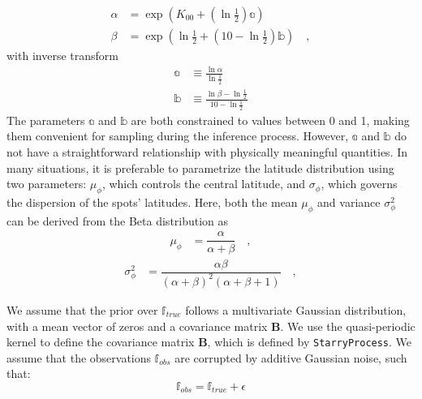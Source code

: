\documentclass[twocolumn]{aastex631}
\begin{document}
%
\begin{align}
    \label{eq:beta2gauss}
    \alpha & = \exp\left({K_{00} + (\ln\frac{1}{2})\mathbb{a}}\right)
    \nonumber                                                 \\
    \beta  & = \exp\left({\ln\frac{1}{2} + (10 - \ln\frac{1}{2})\mathbb{b}}\right)
    \quad,
\end{align}
%
with inverse transform
%
\begin{align}
    \label{eq:gauss2beta}
    \mathbb{a} & \equiv \frac{\ln\alpha}{\ln\frac{1}{2}}
    \nonumber                                             \\[0.5em]
    \mathbb{b} & \equiv \frac{\ln\beta - \ln\frac{1}{2}}{10 -\ln\frac{1}{2}}
\end{align}
%
The parameters $\mathbb{a}$ and $\mathbb{b}$ are both constrained to values between 0 and 1, making them convenient for sampling during the inference process. 
However, $\mathbb{a}$ and $\mathbb{b}$ do not have a straightforward relationship with physically meaningful quantities. In many situations, it is preferable to parametrize 
the latitude distribution using two parameters: $\mu_\phi$, which controls the central latitude, and $\sigma_\phi$, which governs the dispersion of the 
spots' latitudes. Here, both the mean $\mu_\phi$ and variance $\sigma^2_\phi$ can be derived from the Beta distribution as
%
\begin{align}
    \label{eq:mean_beta}
    \mu_\phi
     & =
    \dfrac{\alpha}{\alpha+\beta}
    \quad,
\end{align}
%
\begin{align}
    \label{eq:var_beta}
    \sigma^2_\phi
     & =
    \dfrac{\alpha\beta}{(\alpha+\beta)^2(\alpha+\beta+1)}
    \quad,
\end{align}
%

We assume that the prior over $\mathbb{f}_{true}$ follows a multivariate Gaussian distribution, with a mean vector of zeros and a covariance 
matrix $\pmb{B}$. We use the quasi-periodic kernel to define the covariance matrix $\pmb{B}$, which is defined by \texttt{StarryProcess}.
We assume that the observations $\mathbb{f}_{obs}$ are corrupted by additive Gaussian noise, such that:
\begin{equation}
    \mathbb{f}_{obs} = \mathbb{f}_{true} + \epsilon
\end{equation}
\end{document}

